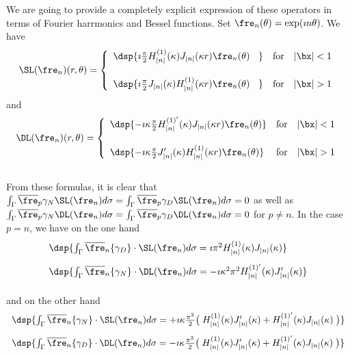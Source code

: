 \documentclass[a4paper,11pt]{article}
\begin{document}
We are going to provide a completely explicit expression of these operators in terms 
of Fourier harrmonics and Bessel functions. Set $\fre_{n}(\theta) = \exp(\imath n\theta)$. 
We have 
$$
\SL(\fre_{n})(r,\theta) = 
\left\{\begin{array}{ll}
\dsp{\imath\frac{\pi}{2}H^{(1)}_{\vert n\vert}(\kappa)J_{\vert n\vert}(\kappa r)\fre_{n}(\theta)\phantom{\imath\kappa} } & \textrm{for}\quad \vert \bx\vert<1\\[15pt]
\dsp{\imath\frac{\pi}{2}J_{\vert n\vert}(\kappa)H^{(1)}_{\vert n\vert}(\kappa r)\fre_{n}(\theta)\phantom{\imath\kappa} } & \textrm{for}\quad \vert \bx\vert>1
\end{array}\right.
$$
and 
$$
\DL(\fre_{n})(r,\theta) = 
\left\{\begin{array}{ll}
\dsp{ -\imath\kappa\frac{\pi}{2}H^{(1)'}_{\vert n\vert}(\kappa)J_{\vert n\vert}(\kappa r)\fre_{n}(\theta) } & \textrm{for}\quad \vert \bx\vert<1\\[15pt]
\dsp{ -\imath\kappa\frac{\pi}{2}J_{\vert n\vert}'(\kappa)H^{(1)}_{\vert n\vert}(\kappa r)\fre_{n}(\theta) } & \textrm{for}\quad \vert \bx\vert>1
\end{array}\right.
$$
\quad\\[5pt]
From these formulas, it is  clear that $\int_{\Gamma}\overline{\fre}_{p}\gamma_{N}\SL(\fre_{n}) d\sigma = \int_{\Gamma}\overline{\fre}_{p}\gamma_{D}\SL(\fre_{n}) d\sigma = 0$ 
as well as $\int_{\Gamma}\overline{\fre}_{p}\gamma_{N}\DL(\fre_{n}) d\sigma = \int_{\Gamma}\overline{\fre}_{p}\gamma_{D}\DL(\fre_{n}) d\sigma = 0$ for $p\neq n$. In the 
case $p=n$, we have on the one hand 
$$
\begin{array}{l}
\dsp{ \int_{\Gamma}\overline{\fre}_{n}\{\gamma_{D}\}\cdot\SL(\fre_{n}) d\sigma = \imath \pi^{2} H^{(1)}_{\vert n\vert}(\kappa) J_{\vert n\vert}(\kappa) }\\[10pt]
\dsp{ \int_{\Gamma}\overline{\fre}_{n}\{\gamma_{N}\}\cdot\DL(\fre_{n}) d\sigma = -\imath \kappa^{2} \pi^{2} H^{(1)'}_{\vert n\vert}(\kappa) J_{\vert n\vert}'(\kappa) }\\[10pt]
\end{array}
$$
and on the other hand 
$$
\begin{array}{l}
\dsp{ \int_{\Gamma}\overline{\fre}_{n}\{\gamma_{N}\}\cdot\SL(\fre_{n}) d\sigma = +\imath\kappa\frac{\pi^{2}}{2}
\big(\; H^{(1)}_{\vert n\vert}(\kappa)J_{\vert n\vert}'(\kappa)+H^{(1)'}_{\vert n\vert}(\kappa)J_{\vert n\vert}(\kappa)\; \big) }\\[10pt]
\dsp{ \int_{\Gamma}\overline{\fre}_{n}\{\gamma_{D}\}\cdot\DL(\fre_{n}) d\sigma = -\imath\kappa\frac{\pi^{2}}{2} 
\big(\; H^{(1)}_{\vert n\vert}(\kappa)J_{\vert n\vert}'(\kappa)+H^{(1)'}_{\vert n\vert}(\kappa)J_{\vert n\vert}(\kappa)\; \big) }\\[10pt]
\end{array}
$$
\end{document}
